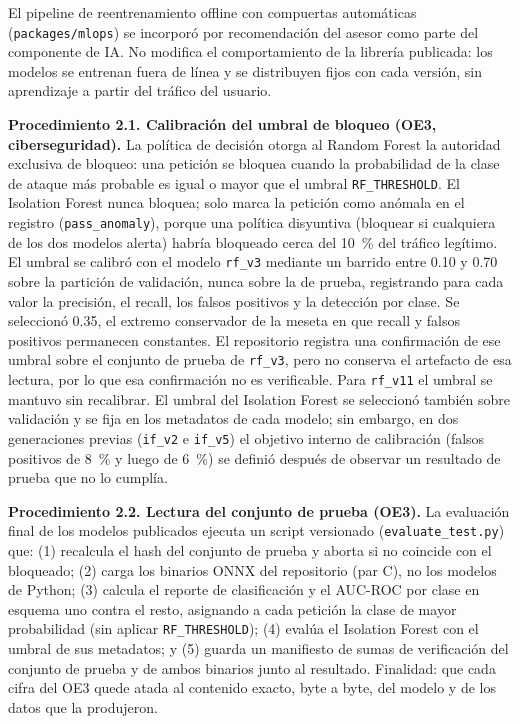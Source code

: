 El pipeline de reentrenamiento offline con compuertas automáticas (\texttt{packages/mlops}) se
incorporó por recomendación del asesor como parte del componente de IA. No modifica el
comportamiento de la librería publicada: los modelos se entrenan fuera de línea y se distribuyen
fijos con cada versión, sin aprendizaje a partir del tráfico del usuario.

\textbf{Procedimiento 2.1. Calibración del umbral de bloqueo (OE3, ciberseguridad).} La
política de decisión otorga al Random Forest la autoridad exclusiva de bloqueo: una petición se
bloquea cuando la probabilidad de la clase de ataque más probable es igual o mayor que el umbral
\texttt{RF\_THRESHOLD}. El Isolation Forest nunca bloquea; solo marca la petición como anómala
en el registro (\texttt{pass\_anomaly}), porque una política disyuntiva (bloquear si cualquiera
de los dos modelos alerta) habría bloqueado cerca del 10~\% del tráfico legítimo. El umbral se
calibró con el modelo \texttt{rf\_v3} mediante un barrido entre 0.10 y 0.70 sobre la partición
de validación, nunca sobre la de prueba, registrando para cada valor la precisión, el recall, los
falsos positivos y la detección por clase. Se seleccionó 0.35, el extremo conservador de la
meseta en que recall y falsos positivos permanecen constantes. El repositorio registra una
confirmación de ese umbral sobre el conjunto de prueba de \texttt{rf\_v3}, pero no conserva el
artefacto de esa lectura, por lo que esa confirmación no es verificable. Para \texttt{rf\_v11} el
umbral se mantuvo sin recalibrar. El umbral del Isolation Forest se seleccionó también sobre
validación y se fija en los metadatos de cada modelo; sin embargo, en dos generaciones previas
(\texttt{if\_v2} e \texttt{if\_v5}) el objetivo interno de calibración (falsos positivos de 8~\% y
luego de 6~\%) se definió después de observar un resultado de prueba que no lo cumplía.

\textbf{Procedimiento 2.2. Lectura del conjunto de prueba (OE3).} La evaluación final de los
modelos publicados ejecuta un script versionado (\texttt{evaluate\_test.py}) que: (1) recalcula el
hash del conjunto de prueba y aborta si no coincide con el bloqueado; (2) carga los binarios ONNX
del repositorio (par C), no los modelos de Python; (3) calcula el reporte de clasificación y el AUC-ROC
por clase en esquema uno contra el resto, asignando a cada petición la clase de mayor
probabilidad (sin aplicar \texttt{RF\_THRESHOLD}); (4) evalúa el Isolation Forest con el umbral de
sus metadatos; y (5) guarda un manifiesto de sumas de verificación del conjunto de prueba y de
ambos binarios junto al resultado. Finalidad: que cada cifra del OE3 quede atada al contenido
exacto, byte a byte, del modelo y de los datos que la produjeron.

